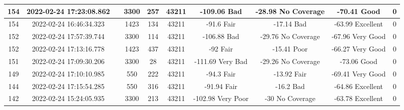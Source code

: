 \begin{longtable*}{|c|c|c|c|c|c|c|c|c|c|}
154&2022-02-24 17:23:08.862&&3300&257&43211& -109.06   Bad         & -28.98    No Coverage & -70.41    Good        & 0\\\hline
{}154&2022-02-24 16:46:34.323&&1423&134&43211& -91.6     Fair        & -17.14    Bad         & -63.99    Excellent   & 0\\\hline
{}152&2022-02-24 17:57:39.744&&3300&114&43211& -106.88   Bad         & -29.76    No Coverage & -67.96    Very Good   & 0\\\hline
{}152&2022-02-24 17:13:16.778&&1423&437&43211& -92       Fair        & -15.41    Poor        & -66.27    Very Good   & 0\\\hline
{}151&2022-02-24 17:09:30.206&&3300&28&43211& -111.69   Very Bad    & -29.26    No Coverage & -73.06    Good        & 0\\\hline
{}149&2022-02-24 17:10:10.985&&550&222&43211& -94.3     Fair        & -13.92    Fair        & -69.41    Very Good   & 0\\\hline
{}144&2022-02-24 17:15:54.285&&550&316&43211& -91.94    Fair        & -16.2     Bad         & -64.86    Excellent   & 0\\\hline
{}142&2022-02-24 15:24:05.935&&3300&213&43211& -102.98   Very Poor   & -30       No Coverage & -63.78    Excellent   & 0\\\hline

\end{longtable*}

